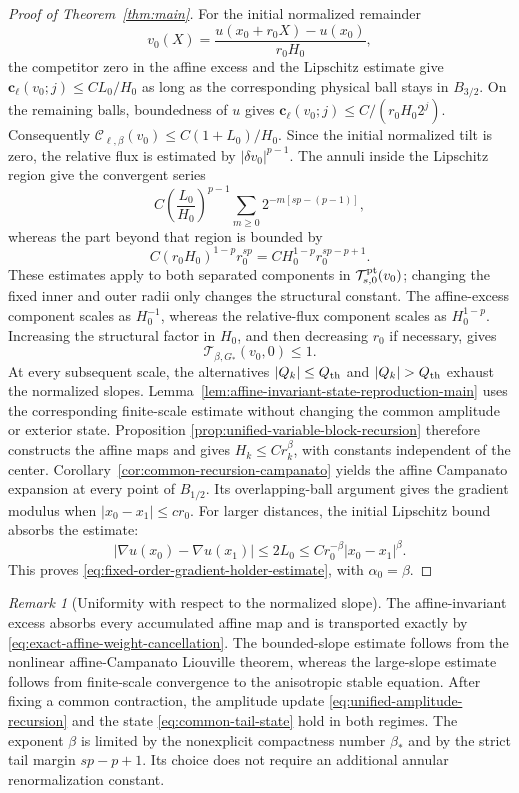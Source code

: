 \documentclass[11pt,reqno]{amsart}
\numberwithin{equation}{section}
\theoremstyle{remark}
\newtheorem{remark}[theorem]{Remark}
\begin{document}
\begin{proof}[Proof of Theorem~\ref{thm:main}]
For the initial normalized remainder
\[
 v_0(X)=\frac{u(x_0+r_0X)-u(x_0)}{r_0H_0},
\]
the competitor zero in the affine excess and the Lipschitz estimate
give \(\mathbf c_\ell(v_0;j)\le CL_0/H_0\) as long as the
corresponding physical ball stays in \(B_{3/2}\).  On the remaining
balls, boundedness of \(u\) gives
\(\mathbf c_\ell(v_0;j)\le C/(r_0H_0 2^j)\).  Consequently
\(\mathscr C_{\ell,\beta}(v_0)\le C(1+L_0)/H_0\).
Since the initial normalized tilt is zero, the relative flux is estimated by
\(|\delta v_0|^{p-1}\).  The annuli inside the Lipschitz region give the
convergent series
\[
 C\left(\frac{L_0}{H_0}\right)^{p-1}
 \sum_{m\ge0}2^{-m[sp-(p-1)]},
\]
whereas the part beyond that region is bounded by
\[
 C(r_0H_0)^{1-p}r_0^{sp}
 =C H_0^{1-p}r_0^{sp-p+1}.
\]
These estimates apply to both separated components in
\(\mathcal T^{\rm pt}_{s,0}(v_0)\); changing the fixed inner and outer
radii only changes the structural constant.
The affine-excess component scales as \(H_0^{-1}\), whereas the
relative-flux component scales as \(H_0^{1-p}\).  Increasing the
structural factor in \(H_0\), and then
decreasing \(r_0\) if necessary, gives
\[
 \mathcal T_{\beta,G_*}(v_0,0)\le1.
\]
At every subsequent scale, the alternatives
\(|Q_k|\le Q_{\rm th}\) and \(|Q_k|>Q_{\rm th}\) exhaust the normalized
slopes.  Lemma~\ref{lem:affine-invariant-state-reproduction-main}
uses the corresponding finite-scale estimate without changing the common
amplitude or exterior state.  Proposition
\ref{prop:unified-variable-block-recursion} therefore constructs the
affine maps and gives \(H_k\le Cr_k^\beta\), with constants independent
of the center.
Corollary~\ref{cor:common-recursion-campanato} yields the affine
Campanato expansion at every point of $B_{1/2}$.  Its overlapping-ball
argument gives the gradient modulus when
\(|x_0-x_1|\le c r_0\).  For larger distances, the initial Lipschitz
bound absorbs the estimate:
\[
 |\nabla u(x_0)-\nabla u(x_1)|
 \le2L_0\le C r_0^{-\beta}|x_0-x_1|^\beta.
\]
This proves \eqref{eq:fixed-order-gradient-holder-estimate}, with
\(\alpha_0=\beta\).
\end{proof}

\begin{remark}[Uniformity with respect to the normalized slope]
\label{rem:logical-content-common-splice}
The affine-invariant excess absorbs every accumulated affine map and is
transported exactly by \eqref{eq:exact-affine-weight-cancellation}.
The bounded-slope estimate follows from the nonlinear affine-Campanato
Liouville theorem, whereas the large-slope estimate follows from
finite-scale convergence to the anisotropic stable equation.  After
fixing a common contraction, the amplitude update
\eqref{eq:unified-amplitude-recursion} and the state
\eqref{eq:common-tail-state} hold in both regimes.  The
exponent \(\beta\) is limited by the nonexplicit compactness number
\(\beta_*\) and by the strict tail margin \(sp-p+1\).  Its choice does
not require an additional annular renormalization constant.
\end{remark}
\end{document}
